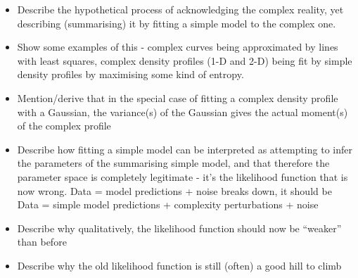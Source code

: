 \documentclass[letterpaper, 11pt]{article}
\begin{document}
\begin{itemize}
\item Describe the hypothetical process of acknowledging the complex reality, yet describing (summarising) it by fitting a simple model to the complex one. \\
\item Show some examples of this - complex curves being approximated by lines with least squares, complex density profiles (1-D and 2-D) being fit by simple density profiles by maximising some kind of entropy.
\item Mention/derive that in the special case of fitting a complex density profile with a Gaussian, the variance(s) of the Gaussian gives the actual moment(s) of the complex profile
\item Describe how fitting a simple model can be interpreted as attempting to infer the parameters of the summarising simple model, and that therefore the parameter space is completely legitimate - it's the likelihood function that is now wrong. Data = model predictions + noise breaks down, it should be Data = simple model predictions + complexity perturbations + noise
\item Describe why qualitatively, the likelihood function should now be ``weaker'' than before
\item Describe why the old likelihood function is still (often) a good hill to climb
\end{itemize}
\end{document}
